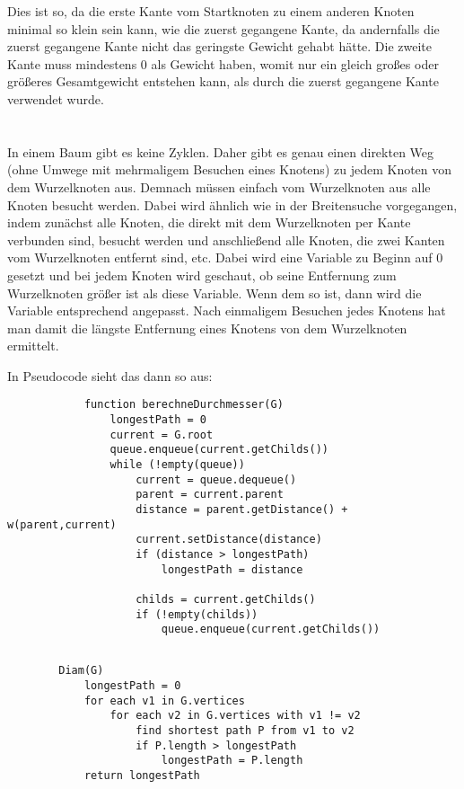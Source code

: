 \documentclass[10pt,a4paper,oneside,ngerman,numbers=noenddot]{scrartcl}
\begin{document}
	Dies ist so, da die erste Kante vom Startknoten zu einem anderen Knoten minimal so klein sein kann, wie die zuerst gegangene Kante, da andernfalls die zuerst gegangene Kante nicht das geringste Gewicht gehabt hätte. Die zweite Kante muss mindestens 0 als Gewicht haben, womit nur ein gleich großes oder größeres Gesamtgewicht entstehen kann, als durch die zuerst gegangene Kante verwendet wurde.
\section{} %
	\subsection{} %
		In einem Baum gibt es keine Zyklen. Daher gibt es genau einen direkten Weg (ohne Umwege mit mehrmaligem Besuchen eines Knotens) zu jedem Knoten von dem Wurzelknoten aus. Demnach müssen einfach vom Wurzelknoten aus alle Knoten besucht werden. Dabei wird ähnlich wie in der Breitensuche vorgegangen, indem zunächst alle Knoten, die direkt mit dem Wurzelknoten per Kante verbunden sind, besucht werden und anschließend alle Knoten, die zwei Kanten vom Wurzelknoten entfernt sind, etc. Dabei wird eine Variable zu Beginn auf 0 gesetzt und bei jedem Knoten wird geschaut, ob seine Entfernung zum Wurzelknoten größer ist als diese Variable. Wenn dem so ist, dann wird die Variable entsprechend angepasst. Nach einmaligem Besuchen jedes Knotens hat man damit die längste Entfernung eines Knotens von dem Wurzelknoten ermittelt.
		
		In Pseudocode sieht das dann so aus:
		
		\begin{verbatim}
		    function berechneDurchmesser(G)
		        longestPath = 0
		        current = G.root
		        queue.enqueue(current.getChilds())
		        while (!empty(queue))
		            current = queue.dequeue()
		   	        parent = current.parent
		   	        distance = parent.getDistance() + w(parent,current)
		   	        current.setDistance(distance)
		            if (distance > longestPath)
		                longestPath = distance
		            
		            childs = current.getChilds()
		            if (!empty(childs))
		                queue.enqueue(current.getChilds())
		\end{verbatim}
	\subsection{} %
		\begin{verbatim}		
		Diam(G)
		    longestPath = 0
		    for each v1 in G.vertices
		        for each v2 in G.vertices with v1 != v2
		            find shortest path P from v1 to v2
		            if P.length > longestPath
		                longestPath = P.length
		    return longestPath
    	\end{verbatim}
    	
\end{document}
